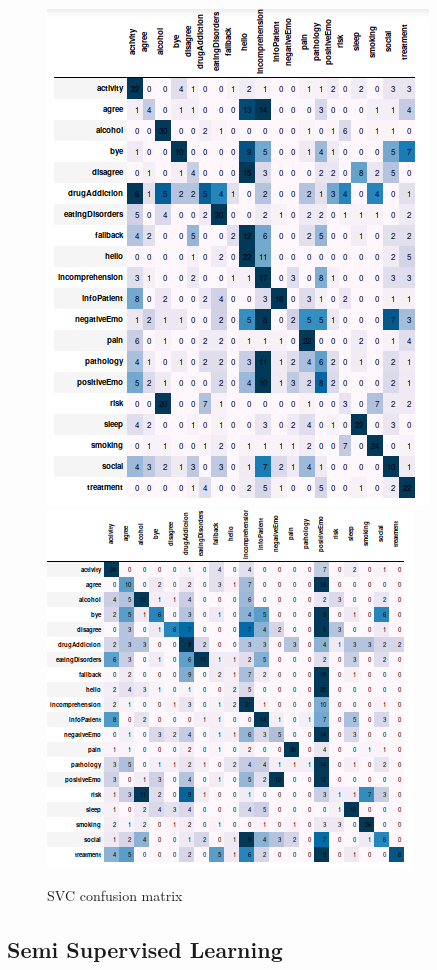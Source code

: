 \documentclass[11pt]{article}
\begin{document}
\begin{figure}[h]
	\centering
	\includegraphics[scale=0.40]{svc0_cm.png}
	\includegraphics[scale=0.40]{lsvc_0.png}
	\caption{SVC confusion matrix}
\label{lda_gm_cm}
\end{figure}
\FloatBarrier


\subsection{Semi Supervised Learning}
\label{subsec:semisupervised}
\end{document}
